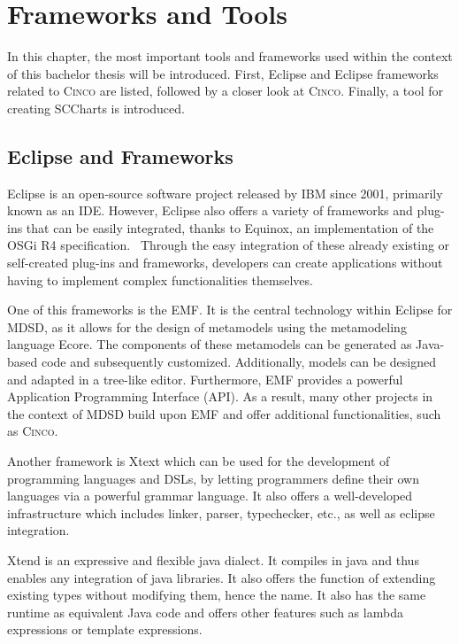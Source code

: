 \chapter{Frameworks and Tools}\label{Frameworks_and_Tools}
In this chapter, the most important tools and frameworks used within the context of this bachelor thesis will be introduced. First, Eclipse and Eclipse frameworks related to \textsc{Cinco} are listed, followed by a closer look at \textsc{Cinco}. Finally, a tool for creating SCCharts is introduced.
\section{Eclipse and Frameworks} 
Eclipse is an open-source software project released by IBM since 2001, primarily known as an IDE. However, Eclipse also offers a variety of frameworks and plug-ins that can be easily integrated, thanks to Equinox, an implementation of the OSGi R4 specification.~\cite{Guindon.03.09.2023b} Through the easy integration of these already existing or self-created plug-ins and frameworks, developers can create applications without having to implement complex functionalities themselves.

One of this frameworks is the EMF. It is the central technology within Eclipse for MDSD, as it allows for the design of metamodels using the metamodeling language Ecore. The components of these metamodels can be generated as Java-based code and subsequently customized. Additionally, models can be designed and adapted in a tree-like editor. Furthermore, EMF provides a powerful Application Programming Interface (API). As a result, many other projects in the context of MDSD build upon EMF and offer additional functionalities, such as \textsc{Cinco}.~\cite{Guindon.03.09.2023b}~\cite{Brambilla.2017}

Another framework is Xtext which can be used for the development of programming languages and DSLs, by letting programmers define their own languages via a powerful grammar language. It also offers a well-developed infrastructure which includes linker, parser, typechecker, etc., as well as eclipse integration. 

Xtend is an expressive and flexible java dialect. It compiles in java and thus enables any integration of java libraries. It also offers the function of extending existing types without modifying them, hence the name. It also has the same runtime as equivalent Java code and offers other features such as lambda expressions or template expressions.

